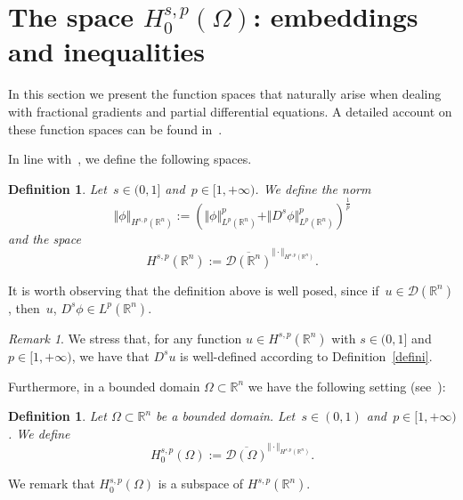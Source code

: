 \documentclass[11pt,hyp,]{nyjm}
\numberwithin{equation}{section}
\newcommand{\R}{\mathbb{R}}
\newtheorem{definition}[theorem]{Definition}
\theoremstyle{remark}
\newtheorem{remark}[theorem]{Remark}
\begin{document}
\section{The space $H_0^{s,p}(\Omega)$: embeddings and inequalities}\label{asd}

In this section we present the function spaces that naturally arise when dealing with fractional gradients and partial differential equations. A detailed account on these function spaces can be found in~\cite{shieh, comi, piola, mora}. 

In line with~\cite{shieh, comi, mora}, we define the following spaces.
\begin{definition}
Let~$s \in (0,1]$ and~$p \in [1, +\infty)$. We define the norm
\begin{equation}\label{odjschv nk:SWDFP}
\Vert \phi \Vert_{H^{s,p}(\R^n)} := \left(\Vert \phi \Vert^{p}_{L^p(\R^n)} + \Vert D^s \phi \Vert^{p}_{L^p(\R^n)}\right)^{\frac1p}
\end{equation}
and the space
\begin{equation}\label{sf}
H^{s,p} (\R^n):= \overline{ \mathcal{D}(\R^n) }^{\Vert \cdot \Vert_{H^{s,p}(\R^n)}}.
\end{equation}
\end{definition}

It is worth observing that the definition above
is well posed, since if~$u\in \mathcal{D}(\R^n) $, then~$u$, $ D^s \phi \in L^p(\R^n)$.

\begin{remark}
We stress that, for any function $u \in H^{s,p}(\R^n)$ with $s \in (0,1]$ and $p \in [1, +\infty)$, we have that $D^s u$ is well-defined according to Definition~\ref{defini}. 
\end{remark}
Furthermore, in a bounded domain $\Omega \subset \R^n$ we have the following setting
(see~\cite[Section 2.3]{mora}):
\begin{definition}
Let $\Omega \subset \R^n$ be a bounded domain. Let~$s \in (0,1)$ and~$p \in [1, +\infty)$. We define
\begin{equation}
H^{s,p}_0 (\Omega):= \overline{\mathcal{D}(\Omega)}^{\Vert \cdot \Vert_{H^{s,p}(\R^n)}}.
\end{equation}
\end{definition}
We remark that $H^{s,p}_0 (\Omega)$ is a subspace of $H^{s,p} (\R^n)$.
 
\end{document}
